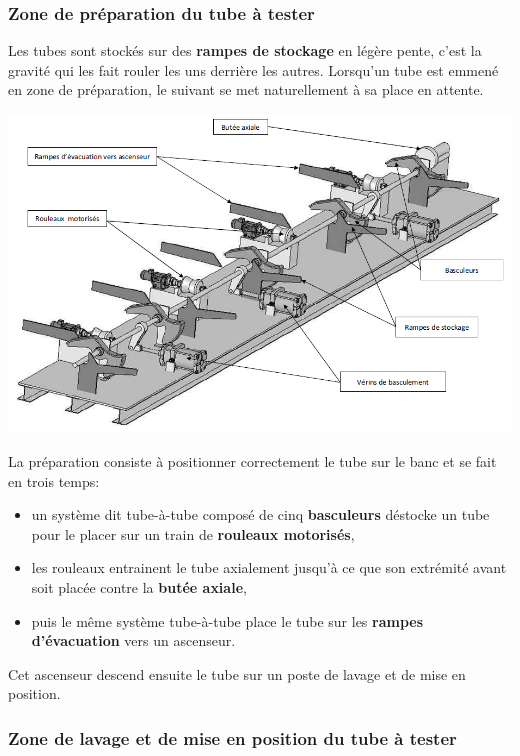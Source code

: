 \subsubsection{Zone de préparation du tube à tester}

Les tubes sont stockés sur des \textbf{rampes de stockage} en légère pente, c'est la gravité qui les fait rouler les uns derrière les autres. Lorsqu'un tube est emmené en zone de préparation, le suivant se met  naturellement à sa place en attente.

\begin{center}
	\includegraphics[width=0.9\linewidth]{img/Annexe2}
\end{center}


La préparation consiste à positionner correctement le tube sur le banc et se fait en trois temps:
\begin{itemize}
 \item un système dit \og tube-à-tube \fg composé de cinq \textbf{basculeurs} déstocke un tube pour le placer sur un train de \textbf{rouleaux motorisés},
 \item les rouleaux entrainent le tube axialement jusqu'à ce que son extrémité avant soit placée contre la \textbf{butée axiale},
 \item puis le même système \og tube-à-tube \fg place le tube sur les \textbf{rampes d'évacuation} vers un ascenseur.
\end{itemize}

Cet ascenseur descend ensuite le tube sur un poste de lavage et de mise en position.

\subsubsection{Zone de lavage et de mise en position du tube à tester}

